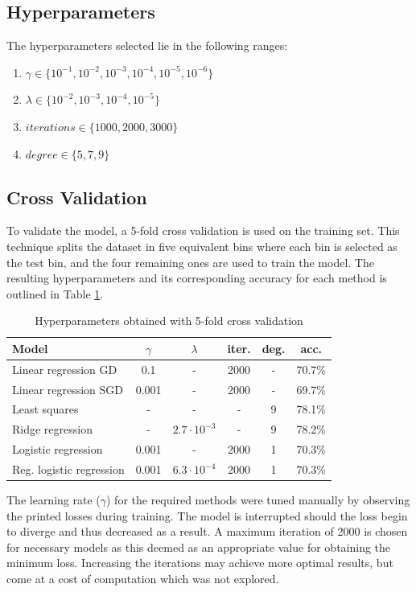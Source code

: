\documentclass[10pt,conference,compsocconf]{IEEEtran}
\begin{document}
\subsection{Hyperparameters}
The hyperparameters selected lie in the following ranges:
\begin{enumerate}
  \item $\gamma \in \{10^{-1}, 10^{-2}, 10^{-3}, 10^{-4}, 10^{-5}, 10^{-6}\}$
  \item $\lambda \in \{10^{-2}, 10^{-3}, 10^{-4}, 10^{-5}\}$
  \item $iterations \in \{1000, 2000, 3000\}$
  \item $degree \in \{5, 7, 9\}$
\end{enumerate}

\subsection{Cross Validation}
To validate the model, a 5-fold cross validation is used on the training set. This technique splits the dataset in five equivalent bins where each bin is selected as the test bin, and the four remaining ones are used to train the model. The resulting hyperparameters and its corresponding accuracy for each method is outlined in Table \ref{tab:hyper}. 

\begin{table}[h!]
  \centering
  \caption{Hyperparameters obtained with 5-fold cross validation}
  \begin{tabular}{|l||c|c|c|c|c|}
      \hline
      \textbf{Model} & \textbf{$\gamma$} & \textbf{$\lambda$} & \textbf{iter.} & \textbf{deg.} & \textbf{acc.}\\ \hline\hline
      Linear regression GD & 0.1 & - & 2000 & - & 70.7\%\\ \hline
      Linear regression SGD & 0.001 & - & 2000 & - & 69.7\%\\ \hline
      Least squares & - & - & - & 9 & 78.1\%\\ \hline
      Ridge regression & - & $2.7\cdot10^{-3}$ & - & 9 & 78.2\%\\ \hline
      Logistic regression & 0.001 & - & 2000 & 1 & 70.3\%\\ \hline
      Reg. logistic regression & 0.001 & $6.3\cdot10^{-4}$ & 2000 & 1 & 70.3\%\\ \hline
  \end{tabular}
  \label{tab:hyper}
\end{table} 

The learning rate ($\gamma$) for the required methods were tuned manually by observing the printed losses during training. The model is interrupted should the loss begin to diverge and thus decreased as a result. A maximum iteration of 2000 is chosen for necessary models as this deemed as an appropriate value for obtaining the minimum loss. Increasing the iterations may achieve more optimal results, but come at a cost of computation which was not explored.
\end{document}
